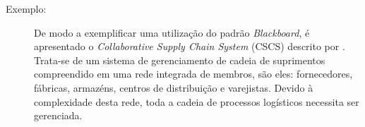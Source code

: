 \begin{description}

\item[Exemplo:] 

De modo a exemplificar uma utilização do padrão \textit{Blackboard}, é apresentado o \textit{Collaborative
Supply Chain System} (CSCS) descrito por . Trata-se de um sistema de gerenciamento de cadeia de suprimentos compreendido em uma rede integrada de membros, são eles: fornecedores, fábricas, armazéns, centros de distribuição e varejistas. Devido à complexidade desta rede, toda a cadeia de processos logísticos necessita ser gerenciada. 


\end{description}
